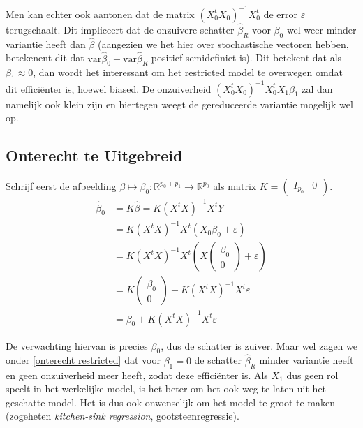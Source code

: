 \documentclass[a4paper]{report}
\begin{document}
  Men kan echter ook aantonen dat de matrix $(X_0^tX_0)^{-1}X_0^t$ de error $\varepsilon$ terugschaalt. Dit impliceert dat de onzuivere schatter $\hat{\beta}_R$ voor $\beta_0$ wel weer minder variantie heeft dan $\hat{\beta}$ (aangezien we het hier over stochastische vectoren hebben, betekenent dit dat $\text{var}\hat{\beta}_0 - \text{var}\hat{\beta}_R$ positief semidefiniet is). Dit betekent dat als $\beta_1 \approx 0$, dan wordt het interessant om het restricted model te overwegen omdat dit effici\"enter is, hoewel biased. De onzuiverheid $(X_0^tX_0)^{-1}X_0^tX_1\beta_1$ zal dan namelijk ook klein zijn en hiertegen weegt de gereduceerde variantie mogelijk wel op.
  
\subsection{Onterecht te Uitgebreid}
\label{onterecht te uitgebreid}
  Schrijf eerst de afbeelding $\beta \mapsto \beta_0: \mathbb{R}^{p_0+p_1} \rightarrow \mathbb{R}^{p_0}$ als matrix $K = \begin{pmatrix} I_{p_0} & 0 \end{pmatrix}$. 
  \begin{align*}
  \hat{\beta}_0 &= K\hat{\beta} = K(X^tX)^{-1}X^tY \\ 
  &= K(X^tX)^{-1}X^t(X_0\beta_0 + \varepsilon) \\
  &= K(X^tX)^{-1}X^t(X\begin{pmatrix} \beta_0 \\ 0 \end{pmatrix} + \varepsilon) \\
  &= K \begin{pmatrix} \beta_0 \\ 0 \end{pmatrix} + K(X^tX)^{-1}X^t\varepsilon \\
  &= \beta_0 + K(X^tX)^{-1}X^t\varepsilon 
  \end{align*}
  
  De verwachting hiervan is precies $\beta_0$, dus de schatter is zuiver. Maar wel zagen we onder \ref{onterecht restricted} dat voor $\beta_1 =0$ de schatter $\hat{\beta}_R$ minder variantie heeft en geen onzuiverheid meer heeft, zodat deze effici\"enter is. Als $X_1$ dus geen rol speelt in het werkelijke model, is het beter om het ook weg te laten uit het geschatte model. Het is dus ook onwenselijk om het model te groot te maken (zogeheten \emph{kitchen-sink regression}, gootsteenregressie).
  
\end{document}

